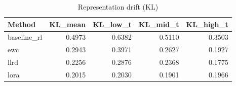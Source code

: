 \begin{table}[htbp]
\centering
\caption{Representation drift (KL)}
\label{tab:repr-drift}
\begin{tabular}{lrrrr}
\toprule
\textbf{Method} & \textbf{KL\_mean} & \textbf{KL\_low\_t} & \textbf{KL\_mid\_t} & \textbf{KL\_high\_t} \\
\midrule
baseline\_rl & 0.4973 & 0.6382 & 0.5110 & 0.3503 \\
ewc & 0.2943 & 0.3971 & 0.2627 & 0.1927 \\
llrd & 0.2256 & 0.2876 & 0.2368 & 0.1775 \\
lora & 0.2015 & 0.2030 & 0.1901 & 0.1966 \\
\bottomrule
\end{tabular}
\end{table}